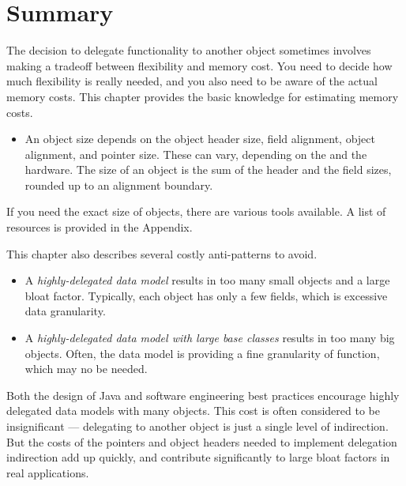 \section{Summary}

The decision to delegate functionality to another object sometimes involves making a tradeoff between flexibility and memory cost. You need to decide how much flexibility is really needed, and you also need to be aware of the actual memory costs. This chapter provides the basic knowledge for estimating memory costs. 
\begin{itemize}
\item An object size depends on the object header size, field alignment, object
alignment, and pointer size. These can vary, depending on the \jre and the
hardware. The size of an object is the sum of the header and the field
sizes, rounded up to an alignment boundary. 
\end{itemize}
If you need the exact size of objects, there are various tools available. A list of resources is provided in the Appendix.

This chapter also describes several costly anti-patterns to avoid.
\begin{itemize}
\item A \textit{highly-delegated data model} results in too many small objects and a large bloat factor. Typically, each object has only a few fields, which is excessive data granularity.  
\item A \textit{highly-delegated data model with large base classes} results in too many big objects. Often, the data model is providing a fine granularity of function, which may no be needed.
\end{itemize}   

Both the design of Java and software engineering best practices encourage highly delegated data models with many objects. This cost is often considered to be insignificant --- delegating to another object is just a single level of indirection. But the costs of the pointers and object headers needed to implement delegation indirection add up quickly, and contribute significantly to large bloat factors in real applications. 

  

